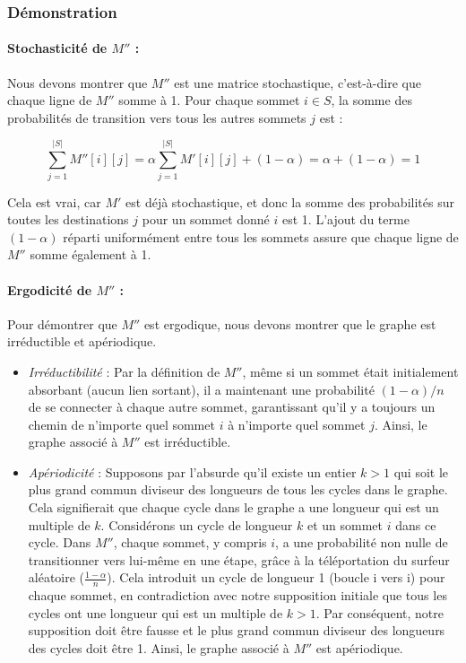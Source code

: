 \subsubsection{Démonstration}

\paragraph{Stochasticité de $M''$ :} Nous devons montrer que $M''$ est une matrice stochastique, c'est-à-dire que chaque ligne de $M''$ somme à 1. Pour chaque sommet $i \in S$, la somme des probabilités de transition vers tous les autres sommets $j$ est :

\[
\sum_{j=1}^{|S|} M''[i][j] = \alpha \sum_{j=1}^{|S|} M'[i][j] + (1-\alpha) = \alpha + (1-\alpha) = 1
\]

Cela est vrai, car $M'$ est déjà stochastique, et donc la somme des probabilités sur toutes les destinations $j$ pour un sommet donné $i$ est 1. L'ajout du terme $(1-\alpha)$ réparti uniformément entre tous les sommets assure que chaque ligne de $M''$ somme également à 1.

\paragraph{Ergodicité de $M''$ :} Pour démontrer que $M''$ est ergodique, nous devons montrer que le graphe est irréductible et apériodique.

\begin{itemize}
    \item \textit{Irréductibilité} : Par la définition de $M''$, même si un sommet était initialement absorbant (aucun lien sortant), il a maintenant une probabilité $(1-\alpha)/n$ de se connecter à chaque autre sommet, garantissant qu'il y a toujours un chemin de n'importe quel sommet $i$ à n'importe quel sommet $j$. Ainsi, le graphe associé à $M''$ est irréductible.
    
    \item \textit{Apériodicité} : Supposons par l'absurde qu'il existe un entier $k > 1$ qui soit le plus grand commun diviseur des longueurs de tous les cycles dans le graphe. Cela signifierait que chaque cycle dans le graphe a une longueur qui est un multiple de $k$. Considérons un cycle de longueur $k$ et un sommet $i$ dans ce cycle. Dans $M''$, chaque sommet, y compris $i$, a une probabilité non nulle de transitionner vers lui-même en une étape, grâce à la téléportation du surfeur aléatoire ($\frac{1-\alpha}{n}$). Cela introduit un cycle de longueur 1 (boucle i vers i) pour chaque sommet, en contradiction avec notre supposition initiale que tous les cycles ont une longueur qui est un multiple de $k > 1$. Par conséquent, notre supposition doit être fausse et le plus grand commun diviseur des longueurs des cycles doit être 1. Ainsi, le graphe associé à $M''$ est apériodique.

\end{itemize}


